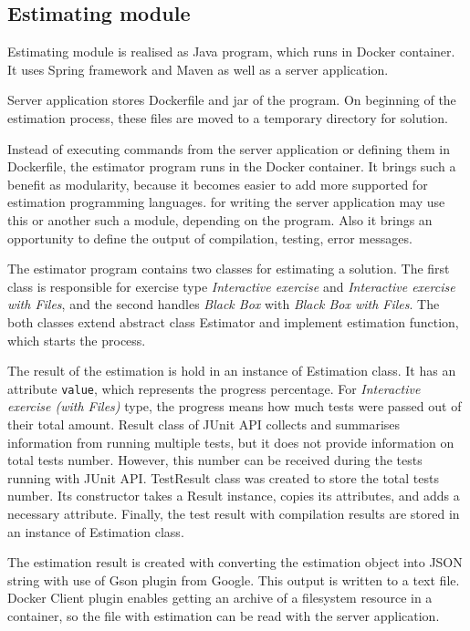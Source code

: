         
        \subsection{Estimating module}
        Estimating module is realised as Java program, which runs in Docker container. It uses Spring framework and Maven as well as a server application.
        
        Server application stores Dockerfile and jar of the program. On beginning of the estimation process, these files are moved to a temporary directory for solution. 
        
        Instead of executing commands from the server application or defining them in Dockerfile, the estimator program runs in the Docker container. It brings such a benefit as modularity, because it becomes easier to add more supported for estimation programming languages. 
        for writing the server application may use this or another such a module, depending on the program. Also it brings an opportunity to define the output of compilation, testing, error messages.
        
        The estimator program contains two classes for estimating a solution. The first class is responsible for exercise type \textit{Interactive exercise} and \textit{Interactive exercise with Files}, and the second handles \textit{Black Box} with \textit{Black Box with Files}. The both classes extend abstract class Estimator and implement estimation function, which starts the process.
        
        The result of the estimation is hold in an instance of Estimation class. It has an attribute \texttt{value}, which represents the progress percentage. For \textit{Interactive exercise (with Files)} type, the progress means how much tests were passed out of their total amount. Result class of JUnit API collects and summarises information from running multiple tests, but it does not provide information on total tests number. However, this number can be received during the tests running with JUnit API. TestResult class was created to store the total tests number. Its constructor takes a Result instance, copies its attributes, and adds a necessary attribute. Finally, the test result with compilation results are stored in an instance of Estimation class.
        
        The estimation result is created with converting the estimation object into JSON string with use of Gson plugin from Google. This output is written to a text file. Docker Client plugin enables getting an archive of a filesystem resource in a container, so the file with estimation can be read with the server application.
        
